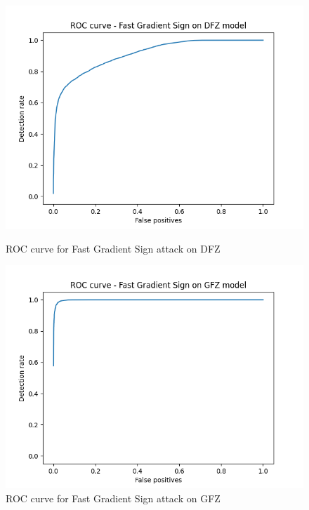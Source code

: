 \documentclass[11pt,twocolumn,letterpaper]{article}
\begin{document}
\begin{figure}[ht]
    \centering
    \begin{minipage}[b]{0.49\textwidth}
        \includegraphics[width=\textwidth]{illustrations/ROC_Fast Gradient Sign_dfz.png}
        \caption{ROC curve for Fast Gradient Sign attack on DFZ}
        \label{fig:roc_fgs_dfz}
    \end{minipage}
    \hfill
    \begin{minipage}[b]{0.49\textwidth}
        \includegraphics[width=\textwidth]{illustrations/ROC_Fast Gradient Sign_gfz.png}
        \caption{ROC curve for Fast Gradient Sign attack on GFZ}
        \label{fig:roc_fgs_gfz}
    \end{minipage}
\end{figure}
\end{document}

